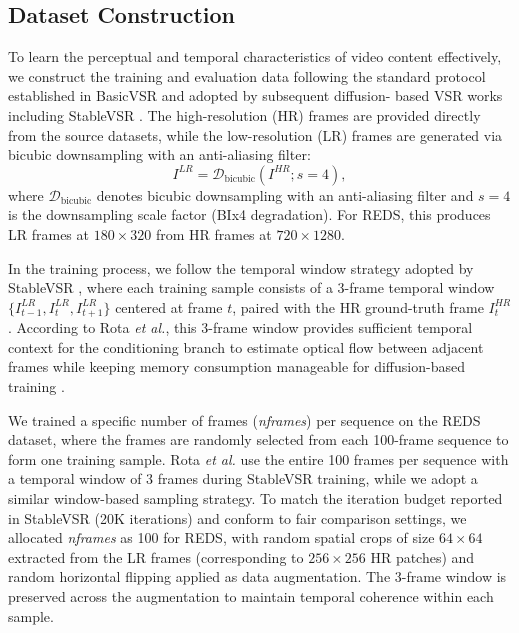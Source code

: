 \subsection{Dataset Construction}
\label{subsec:dataset_construction}

To learn the perceptual and temporal characteristics of video 
content effectively, we construct the training and evaluation 
data following the standard protocol established in BasicVSR 
\cite{chan2021basicvsr} and adopted by subsequent diffusion-
based VSR works including StableVSR \cite{rota2024stablevsr}. 
The high-resolution (HR) frames are provided directly from the 
source datasets, while the low-resolution (LR) frames are 
generated via bicubic downsampling with an anti-aliasing filter:
\begin{equation}
    I^{LR} = \mathcal{D}_{\mathrm{bicubic}}(I^{HR}; s=4),
    \label{eq:bicubic_degradation}
\end{equation}
where $\mathcal{D}_{\mathrm{bicubic}}$ denotes bicubic 
downsampling with an anti-aliasing filter and $s=4$ is the 
downsampling scale factor (BIx4 degradation). For REDS, this 
produces LR frames at $180 \times 320$ from HR frames at 
$720 \times 1280$.

In the training process, we follow the temporal window strategy 
adopted by StableVSR \cite{rota2024stablevsr}, where each 
training sample consists of a 3-frame temporal window 
$\{I^{LR}_{t-1}, I^{LR}_t, I^{LR}_{t+1}\}$ centered at frame 
$t$, paired with the HR ground-truth frame $I^{HR}_t$. 
According to Rota \emph{et al.}, this 3-frame window provides 
sufficient temporal context for the conditioning branch to 
estimate optical flow between adjacent frames while keeping 
memory consumption manageable for diffusion-based training 
\cite{rota2024stablevsr}.

We trained a specific number of frames (\textit{nframes}) per 
sequence on the REDS dataset, where the frames are randomly 
selected from each 100-frame sequence to form one training 
sample. Rota \emph{et al.} use the entire 100 frames per 
sequence with a temporal window of 3 frames during StableVSR 
training, while we adopt a similar window-based sampling 
strategy. To match the iteration budget reported in StableVSR 
(20K iterations) and conform to fair comparison settings, we 
allocated \textit{nframes} as 100 for REDS, with random spatial 
crops of size $64 \times 64$ extracted from the LR frames 
(corresponding to $256 \times 256$ HR patches) and random 
horizontal flipping applied as data augmentation. The 3-frame 
window is preserved across the augmentation to maintain 
temporal coherence within each sample.

